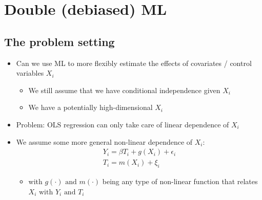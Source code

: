 \documentclass[10pt]{article}
\begin{document}
\section{Double (debiased) ML}
\subsection{The problem setting}
\begin{itemize}
    \item Can we use ML to more flexibly estimate the effects of covariates / control variables $X_i $
    \begin{itemize}
        \item We still assume that we have conditional independence given $X_i $
        \item We have a potentially high-dimensional $X_i $
    \end{itemize}
    \item Problem: OLS regression can only take care of linear dependence of $X_i $
    \item We assume some more general non-linear dependence of $X_i $: 
    \begin{gather*}
        Y_i = \beta T_i + g(X_i) + \epsilon_i\\ 
        T_i = m(X_i) + \xi_i 
    \end{gather*}
    \begin{itemize}
        \item with $g(\cdot)\text{ and }m(\cdot)$ being any type of non-linear function that relates $X_i \text{ with } Y_i \text{ and } T_i $
    \end{itemize}
\end{itemize}
\newpage 
\end{document}
